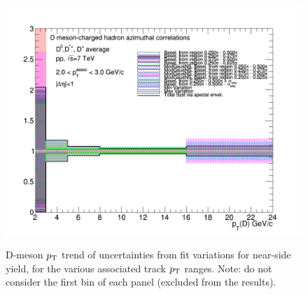 \begin{figure}[!htbp]
{\includegraphics[width=0.48\linewidth, height=0.33\linewidth]{figures/FitOutput/BaselineSystematicSourcesNSYield_pthad2to3.png}}
\caption{D-meson $p_{\rm T}$ trend of uncertainties from fit variations for near-side yield, for the various associated track $p_{\rm T}$ ranges. Note: do not consider the first bin of each panel (excluded from the results).}
\label{fig:NSyield}
\end{figure}
